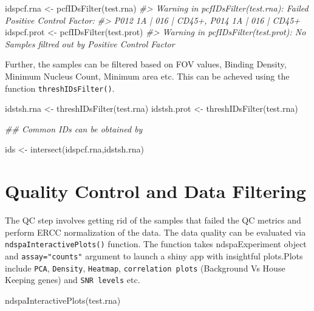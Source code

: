 \documentclass[]{article}
\newcommand{\hlcom}[1]{\textcolor[rgb]{0.502,0.502,0.502}{\textit{#1}}}%
\newcommand{\hlstd}[1]{\textcolor[rgb]{0.251,0.251,0.251}{#1}}%
\newenvironment{Shaded}{\begin{myshaded}}{\end{myshaded}}
\newcommand{\CommentTok}[1]{\hlcom{#1}}
\newcommand{\DocumentationTok}[1]{\hlcom{#1}}
\newcommand{\OtherTok}[1]{{#1}}
\newcommand{\FunctionTok}[1]{\hlstd{#1}}
\newcommand{\NormalTok}[1]{\hlstd{#1}}
\begin{document}
\begin{Shaded}
\begin{Highlighting}[]

\NormalTok{idspcf.rna }\OtherTok{\textless{}{-}} \FunctionTok{pcfIDsFilter}\NormalTok{(test.rna)}
\CommentTok{\#\textgreater{} Warning in pcfIDsFilter(test.rna): Failed Positive Control Factor: }
\CommentTok{\#\textgreater{} P012 1A | 016 | CD45+, P014 1A | 016 | CD45+}
\NormalTok{idspcf.prot }\OtherTok{\textless{}{-}} \FunctionTok{pcfIDsFilter}\NormalTok{(test.prot)}
\CommentTok{\#\textgreater{} Warning in pcfIDsFilter(test.prot): No Samples filtred out by Positive Control Factor}
\end{Highlighting}
\end{Shaded}

Further, the samples can be filtered based on FOV values, Binding Density,
Minimum Nucleus Count, Minimum area etc. This can be acheved using the function \texttt{threshIDsFilter()}.

\begin{Shaded}
\begin{Highlighting}[]
\NormalTok{idstsh.rna }\OtherTok{\textless{}{-}} \FunctionTok{threshIDsFilter}\NormalTok{(test.rna)}
\NormalTok{idstsh.prot }\OtherTok{\textless{}{-}} \FunctionTok{threshIDsFilter}\NormalTok{(test.rna)}

\DocumentationTok{\#\# Common IDs can be obtained by}

\NormalTok{ids }\OtherTok{\textless{}{-}} \FunctionTok{intersect}\NormalTok{(idspcf.rna,idstsh.rna)}
\end{Highlighting}
\end{Shaded}

\hypertarget{quality-control-and-data-filtering}{%
\section{Quality Control and Data Filtering}\label{quality-control-and-data-filtering}}

The QC step involves getting rid of the samples that failed the QC metrics and
perform ERCC normalization of the data. The data quality can be evaluated via
\texttt{ndspaInteractivePlots()} function. The function takes ndspaExperiment object
and \texttt{assay="counts"} argument to launch a shiny app with insightful plots.Plots
include \texttt{PCA}, \texttt{Density}, \texttt{Heatmap}, \texttt{correlation plots} (Background Vs
House Keeping genes) and \texttt{SNR levels} etc.

\begin{Shaded}
\begin{Highlighting}[]
\FunctionTok{ndspaInteractivePlots}\NormalTok{(test.rna)}
\end{Highlighting}
\end{Shaded}
\end{document}
